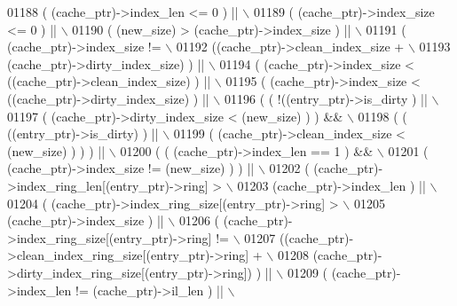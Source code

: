 \begin{DoxyCode}
01188 \textcolor{preprocessor}{     ( (cache\_ptr)->index\_len <= 0 ) ||                                   \(\backslash\)}
01189 \textcolor{preprocessor}{     ( (cache\_ptr)->index\_size <= 0 ) ||                                  \(\backslash\)}
01190 \textcolor{preprocessor}{     ( (new\_size) > (cache\_ptr)->index\_size ) ||                          \(\backslash\)}
01191 \textcolor{preprocessor}{     ( (cache\_ptr)->index\_size !=                                         \(\backslash\)}
01192 \textcolor{preprocessor}{      ((cache\_ptr)->clean\_index\_size +                                \(\backslash\)}
01193 \textcolor{preprocessor}{           (cache\_ptr)->dirty\_index\_size) ) ||                            \(\backslash\)}
01194 \textcolor{preprocessor}{     ( (cache\_ptr)->index\_size < ((cache\_ptr)->clean\_index\_size) ) ||     \(\backslash\)}
01195 \textcolor{preprocessor}{     ( (cache\_ptr)->index\_size < ((cache\_ptr)->dirty\_index\_size) ) ||     \(\backslash\)}
01196 \textcolor{preprocessor}{     ( ( !((entry\_ptr)->is\_dirty ) ||                                     \(\backslash\)}
01197 \textcolor{preprocessor}{        ( (cache\_ptr)->dirty\_index\_size < (new\_size) ) ) &&           \(\backslash\)}
01198 \textcolor{preprocessor}{      ( ( ((entry\_ptr)->is\_dirty)  ) ||                               \(\backslash\)}
01199 \textcolor{preprocessor}{        ( (cache\_ptr)->clean\_index\_size < (new\_size) ) ) ) ||         \(\backslash\)}
01200 \textcolor{preprocessor}{     ( ( (cache\_ptr)->index\_len == 1 ) &&                                 \(\backslash\)}
01201 \textcolor{preprocessor}{       ( (cache\_ptr)->index\_size != (new\_size) ) ) ||                     \(\backslash\)}
01202 \textcolor{preprocessor}{     ( (cache\_ptr)->index\_ring\_len[(entry\_ptr)->ring] >                   \(\backslash\)}
01203 \textcolor{preprocessor}{       (cache\_ptr)->index\_len ) ||                                        \(\backslash\)}
01204 \textcolor{preprocessor}{     ( (cache\_ptr)->index\_ring\_size[(entry\_ptr)->ring] >                  \(\backslash\)}
01205 \textcolor{preprocessor}{       (cache\_ptr)->index\_size ) ||                                       \(\backslash\)}
01206 \textcolor{preprocessor}{     ( (cache\_ptr)->index\_ring\_size[(entry\_ptr)->ring] !=                 \(\backslash\)}
01207 \textcolor{preprocessor}{       ((cache\_ptr)->clean\_index\_ring\_size[(entry\_ptr)->ring] +           \(\backslash\)}
01208 \textcolor{preprocessor}{        (cache\_ptr)->dirty\_index\_ring\_size[(entry\_ptr)->ring]) ) ||       \(\backslash\)}
01209 \textcolor{preprocessor}{     ( (cache\_ptr)->index\_len != (cache\_ptr)->il\_len ) ||                 \(\backslash\)}

\end{DoxyCode}
